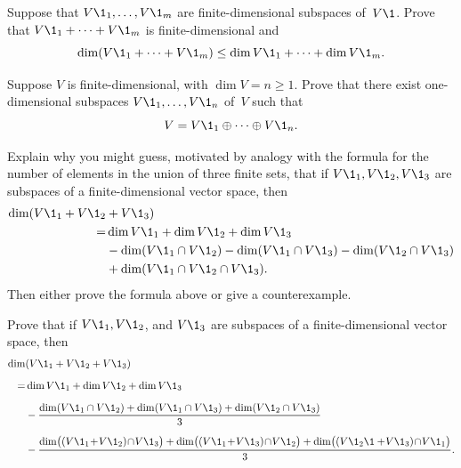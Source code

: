 \begin{exercises}
\exercise
Suppose that $V\1_1, \dots, V\1_m$ are finite-dimensional subspaces of~$V\1$. Prove that $V\1_1 + \dots + V\1_m$ is finite-dimensional and
\[
\dim (V\1_1 + \dots + V\1_m) \le \dim V\1_1 + \dots + \dim V\1_m.
\]
{}


\exercise
Suppose $V$ is finite-dimensional, with $\dim V = n \ge 1$.  Prove that there
exist one-dimensional subspaces $V\1_1, \dots, V\1_n$ of~$V$ such that \label{8exer}
\[
V = V\1_1 \oplus \dots \oplus V\1_n.
\]
\exercisedisplayend

\exercise
Explain why you might guess, motivated by analogy with the formula for the number of elements in the
union of three finite sets, that if $V\1_1, V\1_2, V\1_3$ are subspaces
of a finite-dimensional vector space, then
\begin{align*}
\dim(V\1_1 + V\1_2 &+ V\1_3)\\
=&\dim V\1_1 + \dim V\1_2 + \dim V\1_3 \\
&{} - \dim (V\1_1 \cap V\1_2) - \dim (V\1_1 \cap V\1_3) - \dim (V\1_2 \cap V\1_3) \\
&+ \dim (V\1_1 \cap V\1_2 \cap V\1_3).
\end{align*}
Then either prove the formula above or give a counterexample.


\exercise
Prove that if $V\1_1, V\1_2$, and $V\1_3$ are subspaces of a finite-dimensional vector space, then
\begin{align*}
\dim&(V\1_1 + V\1_2+ V\1_3) \\[6bp]
= & \dim V\1_1 + \dim V\1_2 + \dim V\1_3\\[6bp]
&-	\frac{ \dim(V\1_1 \cap V\1_2) + \dim(V\1_1 \cap V\1_3) + \dim(V\1_2 \cap V\1_3) }{3}\\[6bp]
&-	\frac{ \dim\bigl( (V\1_1\! +\! V\1_2)\! \cap\! V\1_3 \bigr)
+ \dim\bigl( (V\1_1 \!+\! V\1_3)\! \cap\! V\1_2 \bigr)
+ \dim\bigl( (V\1_2\1 +\! V\1_3)\! \cap\! V\1_1 \bigr) }{3}.
\end{align*}


\end{exercises}

